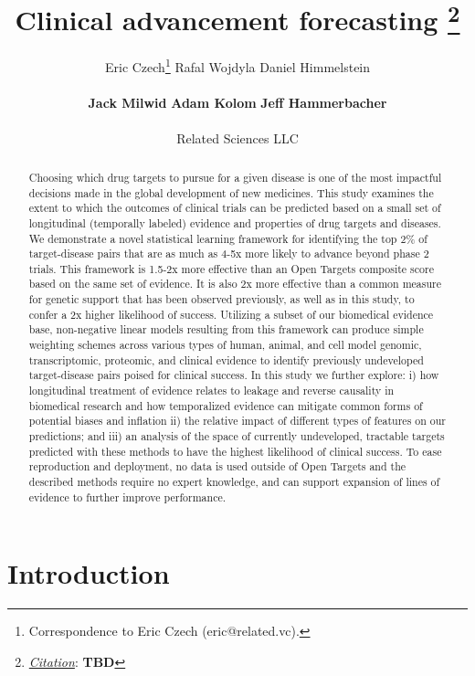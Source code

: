 \documentclass{article}
\title{Clinical advancement forecasting
\thanks{\textit{\underline{Citation}}: 
\textbf{TBD}} 
}
\author{
  Eric Czech\thanks{Correspondence to Eric Czech (eric@related.vc).} \hspace{0.2cm} 
  Rafal Wojdyla \hspace{0.2cm} 
  Daniel Himmelstein \hspace{0.2cm} 
  \\ \\
  \textbf{Jack Milwid} \hspace{0.2cm} 
  \textbf{Adam Kolom} \hspace{0.2cm} 
  \textbf{Jeff Hammerbacher}
  \\ \\
  Related Sciences LLC
}
\begin{document}
\maketitle


\def\evaluationDatasetPairCount{9010}
\def\topRankingPct{2}
\def\bottomRankingPct{98}

\begin{abstract}
Choosing which drug targets to pursue for a given disease is one of the most impactful decisions made in the global development of new medicines. This study examines the extent to which the outcomes of clinical trials can be predicted based on a small set of longitudinal (temporally labeled) evidence and properties of drug targets and diseases. We demonstrate a novel statistical learning framework for identifying the top \topRankingPct\% of target-disease pairs that are as much as 4-5x more likely to advance beyond phase 2 trials. This framework is 1.5-2x more effective than an Open Targets composite score based on the same set of evidence. It is also 2x more effective than a common measure for genetic support that has been observed previously, as well as in this study, to confer a 2x higher likelihood of success. Utilizing a subset of our biomedical evidence base, non-negative linear models resulting from this framework can produce simple weighting schemes across various types of human, animal, and cell model genomic, transcriptomic, proteomic, and clinical evidence to identify previously undeveloped target-disease pairs poised for clinical success. In this study we further explore: i) how longitudinal treatment of evidence relates to leakage and reverse causality in biomedical research and how temporalized evidence can mitigate common forms of potential biases and inflation ii) the relative impact of different types of features on our predictions; and iii) an analysis of the space of currently undeveloped, tractable targets predicted with these methods to have the highest likelihood of clinical success. To ease reproduction and deployment, no data is used outside of Open Targets and the described methods require no expert knowledge, and can support expansion of lines of evidence to further improve performance.
\end{abstract}

\section{Introduction}
\label{sec:introduction}
\end{document}
